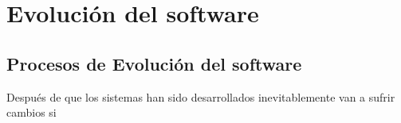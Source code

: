 \section{Evolución del software}
\subsection{Procesos de Evolución del software}
Después de que los sistemas han sido desarrollados inevitablemente van a sufrir cambios si 
